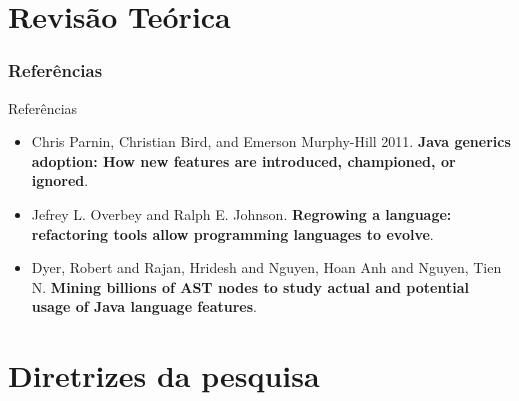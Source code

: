 \documentclass[]{beamer}
\begin{document}
	

	
%			



	\section{Revisão Teórica}
	\frametitle{Referências}
	\begin{frame}[label=referencias]
		\begin{block}{Referências}
			\begin{itemize}
				\item Chris Parnin, Christian Bird, and Emerson Murphy-Hill 2011. \textbf{Java generics adoption: How new features are introduced, championed, or ignored}.
				
				\item Jefrey L. Overbey and Ralph E. Johnson. \textbf{Regrowing a language: refactoring tools
				allow programming languages to evolve}.
				
				\item Dyer, Robert and Rajan, Hridesh and Nguyen, Hoan Anh and Nguyen, Tien N. \textbf{Mining billions of AST nodes to study actual and potential usage of Java language features}.
			\end{itemize}
			
		\end{block}
	\end{frame}
	



	\section{Diretrizes da pesquisa}
\end{document}
